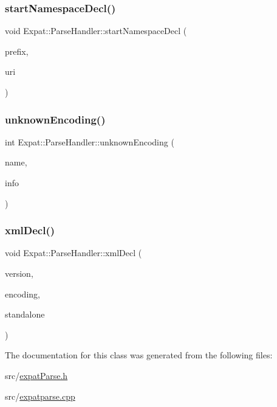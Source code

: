 \subsubsection{\texorpdfstring{start\+Namespace\+Decl()}{startNamespaceDecl()}}
{\footnotesize\ttfamily void Expat\+::\+Parse\+Handler\+::start\+Namespace\+Decl (\begin{DoxyParamCaption}\item[{const X\+M\+L\+\_\+\+Char $\ast$}]{prefix,  }\item[{const X\+M\+L\+\_\+\+Char $\ast$}]{uri }\end{DoxyParamCaption})\hspace{0.3cm}{\ttfamily [virtual]}}

\hypertarget{class_expat_1_1_parse_handler_a85918826630176ca85004f828255fdbb}{}\label{class_expat_1_1_parse_handler_a85918826630176ca85004f828255fdbb} 
\subsubsection{\texorpdfstring{unknown\+Encoding()}{unknownEncoding()}}
{\footnotesize\ttfamily int Expat\+::\+Parse\+Handler\+::unknown\+Encoding (\begin{DoxyParamCaption}\item[{const X\+M\+L\+\_\+\+Char $\ast$}]{name,  }\item[{X\+M\+L\+\_\+\+Encoding $\ast$}]{info }\end{DoxyParamCaption})\hspace{0.3cm}{\ttfamily [virtual]}}

\hypertarget{class_expat_1_1_parse_handler_addc24d4f9b97fd033deb8c1d14d6b9b8}{}\label{class_expat_1_1_parse_handler_addc24d4f9b97fd033deb8c1d14d6b9b8} 
\subsubsection{\texorpdfstring{xml\+Decl()}{xmlDecl()}}
{\footnotesize\ttfamily void Expat\+::\+Parse\+Handler\+::xml\+Decl (\begin{DoxyParamCaption}\item[{const X\+M\+L\+\_\+\+Char $\ast$}]{version,  }\item[{const X\+M\+L\+\_\+\+Char $\ast$}]{encoding,  }\item[{int}]{standalone }\end{DoxyParamCaption})\hspace{0.3cm}{\ttfamily [virtual]}}



The documentation for this class was generated from the following files\+:\begin{DoxyCompactItemize}
\item 
src/\hyperlink{expat_parse_8h}{expat\+Parse.\+h}\item 
src/\hyperlink{expatparse_8cpp}{expatparse.\+cpp}\end{DoxyCompactItemize}
